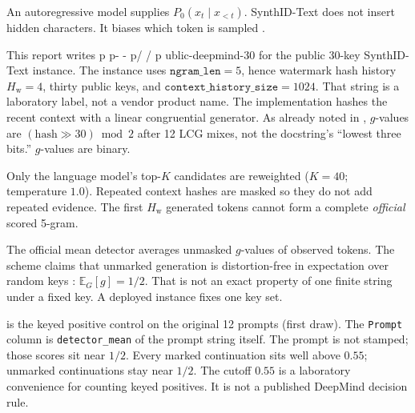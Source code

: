 \documentclass[11pt,a4paper]{article}
\makeatletter
\newcommand{\ttfile}[1]{\bgroup\ttfamily\ttfile@scan#1\relax\egroup}
\def\ttfile@scan#1{%
  \ifx#1\relax
  \else
    \ifx#1-%
      -\penalty0 %
    \else
      \ifx#1/%
        /\penalty0 %
      \else
        #1%
      \fi
    \fi
    \expandafter\ttfile@scan
  \fi}
\theoremstyle{definition}
\newcommand{\E}{\mathbb{E}}
\newcommand{\Hw}{H_{\mathrm{w}}}
\newcommand{\Ktop}{K}
\makeatother
\begin{document}
An autoregressive model supplies $P_0(x_t \mid x_{<t})$. SynthID-Text
does not insert hidden characters. It biases which token is sampled
\citep{dathathri2024synthid}.

This report writes \ttfile{public-deepmind-30} for the public 30-key
SynthID-Text instance. The instance uses $\mathtt{ngram\_len}=5$, hence
watermark hash history $\Hw=4$, thirty public keys, and
$\mathtt{context\_history\_size}=1024$. That string is a laboratory
label, not a vendor product name. The implementation hashes the recent
context with a linear congruential generator. As already noted in
, $g$-values are $(\mathrm{hash}\gg 30)\bmod 2$ after
12 LCG mixes, not the docstring's ``lowest three bits.'' $g$-values are
binary.

Only the language model's top-$\Ktop$ candidates are reweighted
($\Ktop=40$; temperature $1.0$). Repeated context hashes are masked so
they do not add repeated evidence. The first $\Hw$ generated tokens
cannot form a complete \emph{official} scored 5-gram.

The official mean detector averages unmasked $g$-values of observed
tokens. The scheme claims that unmarked generation is distortion-free
in expectation over random keys \citep{dathathri2024synthid}:
$\E_G[g]=1/2$. That is not an exact property of one finite string under
a fixed key. A deployed instance fixes one key set.

 is the keyed positive control on the original 12
prompts (first draw). The \texttt{Prompt} column is
\texttt{detector\_mean} of the prompt string itself. The prompt is not
stamped; those scores sit near $1/2$. Every marked continuation sits
well above $0.55$; unmarked continuations stay near $1/2$. The cutoff
$0.55$ is a laboratory convenience for counting keyed positives. It is
not a published DeepMind decision rule.
\end{document}
